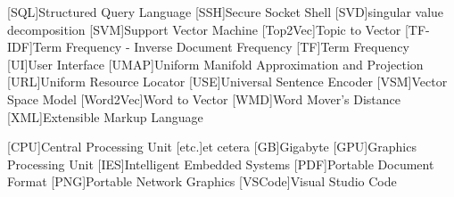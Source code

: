 \begin{acronym}[XXXXXXXXX]
    [SQL]{Structured Query Language}
    [SSH]{Secure Socket Shell}
    [SVD]{singular value decomposition}
    [SVM]{Support Vector Machine}
    [Top2Vec]{Topic to Vector}
    [TF-IDF]{Term Frequency - Inverse Document Frequency}
    [TF]{Term Frequency}
    [UI]{User Interface}
    [UMAP]{Uniform Manifold Approximation and Projection}
    [URL]{Uniform Resource Locator}
    [USE]{Universal Sentence Encoder}
    [VSM]{Vector Space Model}
    [Word2Vec]{Word to Vector}
    [WMD]{Word Mover's Distance}
    [XML]{Extensible Markup Language}



    \vspace{\parskip}
    [CPU]{Central Processing Unit}
    [etc.]{et cetera}    [GB]{Gigabyte}
    [GPU]{Graphics Processing Unit}
    [IES]{Intelligent Embedded Systems}
    [PDF]{Portable Document Format}
    [PNG]{Portable Network Graphics}
    [VSCode]{Visual Studio Code}

\end{acronym}
